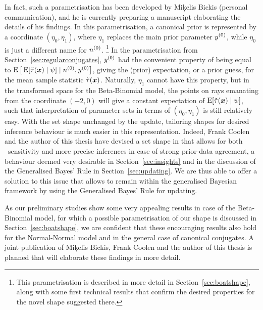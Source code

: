 In fact, such a parametrisation has been developed by Mi\c{k}elis Bickis (personal communication),
and he is currently preparing a manuscript elaborating the details of his findings.
In this parametrisation, a canonical prior is represented by a coordinate $(\eta_0,\eta_1)$,
where $\eta_1$ replaces the main prior parameter $y^{(0)}$,
while $\eta_0$ is just a different name for $n^{(0)}$.%
\footnote{This parametrisation is described in more detail in Section~\ref{sec:boatshape},
along with some first technical results that confirm the desired properties for the novel shape suggested there.}
In the parametrisation from Section~\ref{sec:regularconjugates},
$y^{(0)}$ had the convenient property of being equal to $\operatorname{E}\big[\operatorname{E}[\tilde{\tau}({\bm x}) \mid \psi] \mid n^{(0)}, y^{(0)}\big]$,
giving the (prior) expectation, or a prior guess, for the mean sample statistic $\tilde{\tau}({\bm x})$.
Naturally, $\eta_1$ cannot have this property,
but in the transformed space for the Beta-Binomial model, the points on rays emanating from the coordinate $(-2,0)$
will give a constant expectation of $\operatorname{E}[\tilde{\tau}({\bm x}) \mid \psi]$,
such that interpretation of parameter sets in terms of $(\eta_0,\eta_1)$ is still relatively easy.
With the set shape unchanged by the update, 
tailoring shapes for desired inference behaviour is much easier in this representation.
Indeed, Frank Coolen and the author of this thesis have devised
a set shape in %
that allows for both \pdc\ sensitivity
and more precise inferences in case of strong prior-data agreement,
a behaviour deemed very desirable in Section~\ref{sec:insights}
and in the discussion of the Generalised Bayes' Rule in Section~\ref{sec:updating}.
We are thus able to offer a solution to this issue that allows to remain within the generalised Bayesian framework
by using the Generalised Bayes' Rule for updating.

As our preliminary studies show some very appealing results in case of the Beta-Binomial model,
for which a possible parametrisation of our shape is discussed in Section~\ref{sec:boatshape},
we are confident that these encouraging results also hold for the Normal-Normal model
and in the general case of canonical conjugates.
A joint publication of Mi\c{k}elis Bickis, Frank Coolen and the author of this thesis is planned
that will elaborate these findings in more detail.

